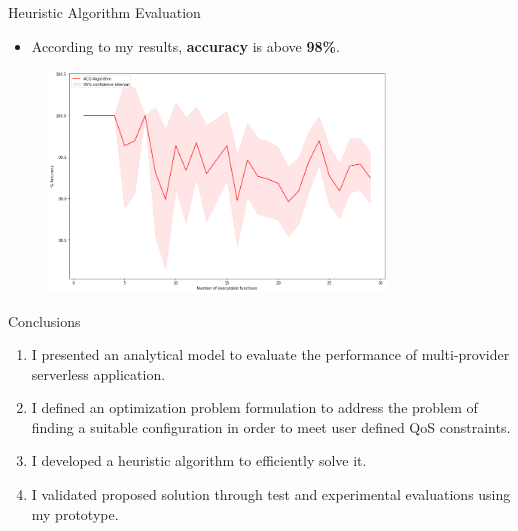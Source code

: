 \documentclass[13.5pt]{beamer}
\newcommand{\B}[1]{\textcolor{TorVergataColor}{\textbf{#1}}}
\begin{document}

\begin{frame}{Heuristic Algorithm Evaluation}
	
	\begin{itemize}
		\item According to my results, \B{accuracy} is above \B{98\%}.
	\end{itemize}
	
	\begin{figure}[h]
		\centering
		\includegraphics[width=0.8\textwidth,height=0.55\columnwidth]{../Images/ACOvsOptimalAccuracyIncreasingExecutable.png}
	\end{figure}
	
\end{frame}



\begin{frame}{Conclusions}

\begin{enumerate}
	
	\item I presented an analytical model to evaluate the performance of multi-provider serverless application.
	\vspace{\baselineskip}
	\item I defined an optimization problem formulation to address the problem of finding a suitable configuration in order to meet user defined QoS constraints.
	\vspace{\baselineskip}
	\item I developed a heuristic algorithm to efficiently solve it.
	\vspace{\baselineskip}
	\item I validated proposed solution through test and experimental evaluations using my prototype.	
\end{enumerate}
\end{frame}
\end{document}
